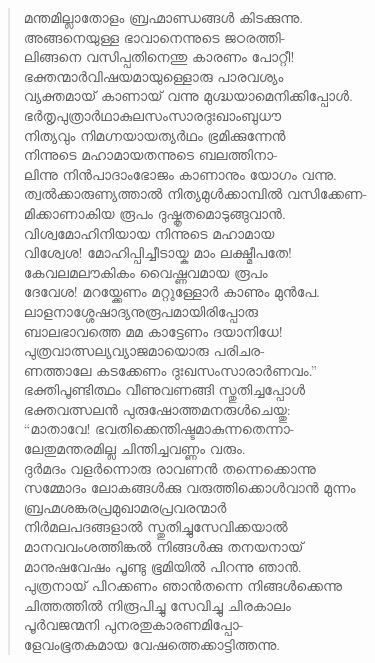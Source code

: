 \begin{verse}
മന്തമില്ലാതോളം ബ്രഹ്മാണ്ഡങ്ങള്‍ കിടക്കുന്നു.\\
അങ്ങനെയുള്ള ഭാവാനെന്നുടെ ജഠരത്തി-\\
ലിങ്ങനെ വസിപ്പതിനെന്തു കാരണം പോറ്റീ!\\
ഭക്തന്മാര്‍വിഷയമായുള്ളൊരു പാരവശ്യം\\
വ്യക്തമായ് കാണായ് വന്നു മുഗ്ദ്ധയാമെനിക്കിപ്പോള്‍.\\
ഭര്‍തൃപുത്രാര്‍ഥാകുലസംസാരദുഃഖാംബുധൗ\\
നിത്യവും നിമഗ്നയായത്യര്‍ഥം ഭ്രമിക്കുന്നേന്‍\\
നിന്നുടെ മഹാമായതന്നുടെ ബലത്തിനാ-\\
ലിന്നു നിന്‍പാദാംഭോജം കാണാനും യോഗം വന്നു.\\
ത്വല്‍ക്കാരുണ്യത്താല്‍ നിത്യമുള്‍ക്കാമ്പില്‍ വസിക്കേണ-\\
മിക്കാണാകിയ രൂപം ദുഷ്കൃതമൊടുങ്ങുവാന്‍.\\
വിശ്വമോഹിനിയായ നിന്നുടെ മഹാമായ\\
വിശ്വേശ! മോഹിപ്പിച്ചീടായ്ക മാം ലക്ഷ്മീപതേ!\\
കേവലമലൗകികം വൈഷ്ണവമായ രൂപം\\
ദേവേശ! മറയ്ക്കേണം മറ്റുള്ളോര്‍ കാണും മുന്‍പേ.\\
ലാളനാശ്ശേഷാദ്യനുരൂപമായിരിപ്പോരു\\
ബാലഭാവത്തെ മമ കാട്ടേണം ദയാനിധേ!\\
പുത്രവാത്സല്യവ്യാജമായൊരു പരിചര-\\
ണത്താലേ കടക്കേണം ദുഃഖസംസാരാര്‍ണവം.”\\
ഭക്തിപൂണ്ടിത്ഥം വീണുവണങ്ങി സ്തുതിച്ചപ്പോള്‍\\
ഭക്തവത്സലന്‍ പുരുഷോത്തമനരുള്‍ചെയ്തു:\\
“മാതാവേ! ഭവതിക്കെന്തിഷ്ടമാകുന്നതെന്നാ-\\
ലേതുമന്തരമില്ല ചിന്തിച്ചവണ്ണം വരും.\\
ദുര്‍മദം വളര്‍ന്നൊരു രാവണന്‍ തന്നെക്കൊന്നു\\
സമ്മോദം ലോകങ്ങള്‍ക്കു വരുത്തിക്കൊള്‍വാന്‍ മുന്നം\\
ബ്രഹ്മശങ്കരപ്രമുഖാമരപ്രവരന്മാര്‍\\
നിര്‍മലപദങ്ങളാല്‍ സ്തുതിച്ചുസേവിക്കയാല്‍\\
മാനവവംശത്തിങ്കല്‍ നിങ്ങള്‍ക്കു തനയനായ്\\
മാനുഷവേഷം പൂണ്ടു ഭൂമിയില്‍ പിറന്നു ഞാന്‍.\\
പുത്രനായ് പിറക്കണം ഞാന്‍തന്നെ നിങ്ങള്‍ക്കെന്നു\\
ചിത്തത്തില്‍ നിരൂപിച്ചു സേവിച്ചു ചിരകാലം\\
പൂര്‍വജന്മനി പുനരതുകാരണമിപ്പോ-\\
ളേവംഭൂതകമായ വേഷത്തെക്കാട്ടിത്തന്നു.\\

\end{verse}
